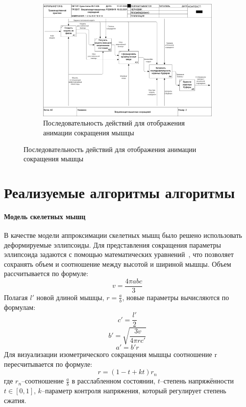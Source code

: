 \begin{figure}
	\begin{figure}[H]
		\centering
		\includegraphics[height=0.5\paperheight]{images/02_A0}
		\caption[Последовательность действий для отображения анимации сокращения мышцы]{Последовательность действий для отображения анимации сокращения мышцы}
		\label{fig:02a0}
	\end{figure}
\end{figure}

\section{Реализуемые алгоритмы алгоритмы}
\label{sec:algs}
\paragraph{Модель скелетных мышц}
В качестве модели аппроксимации скелетных мышц было решено использовать деформируемые эллипсоиды. Для представления сокращения параметры эллипсоида задаются с помощью математических уравнений~\cite{scheepers97}, что позволяет сохранять объем и соотношение между высотой и шириной мышцы. Объем рассчитывается по формуле:
\begin{equation}
	v = \frac{4\pi abc}{3}
\end{equation}
Полагая $l'$ новой длиной мышцы, $r=\frac{a}{b}$, новые параметры вычисляются по формулам:
\begin{equation}
	c'=\frac{l'}{2}
\end{equation}
\begin{equation}
	b'=\sqrt{\frac{3v}{4\pi rc'}}
\end{equation}
\begin{equation}
	a'=b'r
\end{equation}
Для визуализации изометрического сокращения мышцы соотношение r пересчитывается по формуле:
\begin{equation}
	r=(1-t+kt)r_n
\end{equation}
где $r_n$--соотношение $\frac{a}{b}$ в расслабленном состоянии, $t$--степень напряжённости $t\in [0,1]$, $k$--параметр контроля напряжения, который регулирует степень сжатия.

